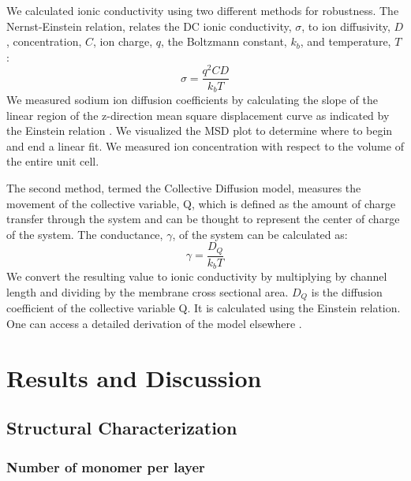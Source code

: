\documentclass[journal=jpcbfk,manusciprt=article]{achemso}
\begin{document}
  We calculated ionic conductivity using two different methods for robustness.
  The Nernst-Einstein relation, relates the DC ionic conductivity, $\sigma$, to ion
  diffusivity, $D$, concentration, $C$, ion charge, $q$, the Boltzmann constant,
  $k_b$, and temperature, $T$: 
  \begin{equation}
	\sigma = \dfrac{q^2CD}{k_b T} 
	\label{eqn:nernst_einstein}
  \end{equation}
  We measured sodium ion diffusion coefficients by calculating the slope
  of the linear region of the z-direction mean square displacement curve as
  indicated by the Einstein relation \cite{einstein_investigations_1956}. We
  visualized the MSD plot to determine where to begin and end a linear fit. We
  measured ion concentration with respect to the volume of the entire unit cell. 

  The second method, termed the Collective Diffusion model, measures the
  movement of the collective variable, Q, which is defined as the amount of
  charge transfer through the system and can be thought to represent the center
  of charge of the system. The conductance, $\gamma$, of the system can be
  calculated as:
  \begin{equation}
	 \gamma = \dfrac{D_Q}{k_b T} 
	\label{eqn:collective_diffusion}
  \end{equation}
  We convert the resulting value to ionic conductivity by multiplying by
  channel length and dividing by the membrane cross sectional area. $D_Q$ is the
  diffusion coefficient of the collective variable Q. It is calculated using the
  Einstein relation. One can access a detailed derivation of the model elsewhere
  \cite{liu_collective_2013}.

  \section{Results and Discussion}
  
  \subsection{Structural Characterization}
  \subsubsection{Number of monomer per layer}
\end{document}
